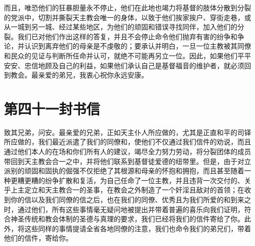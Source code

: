 而且，唯恐他们的狂暴胆量永不停止，他们在此地也竭力将基督的肢体分散到分裂的党派中，切割并撕裂天主教会唯一的身体，以致于他们挨家挨户、穿街走巷，或从一城到另一城、经过某些地区，为他们的顽固和错误寻找同伴，加入他们的分裂。我们已对他们作出这样的答复，并且不会停止命令他们抛弃有害的纷争和争论，并认识到离弃他们的母亲是不虔敬的；要承认并明白，一旦一位主教被其同僚和民众的见证与判断所任命并认可，就绝不可能再另立一位。因此，如果他们平平安安、忠信地顾及自己的利益，如果他们承认自己是基督福音的维护者，就必须回到教会。最亲爱的弟兄，我衷心祝你永远安康。\par



\section{第四十一封书信}

\par

\par

致其兄弟，问安。最亲爱的兄弟，正如天主仆人所应做的，尤其是正直和平的司铎所应做的，我们最近派遣了我们的同僚和，使他们不仅通过我们信件的劝说，而且通过他们本人的在场和你们所有人的建议，竭尽全力努力劳动，将分裂团体的成员带回到天主教会合一之中，并将他们联系到基督徒爱德的纽带里。但是，由于对立派别的顽固和固执的倔强不仅拒绝了其根源和母亲的怀抱和拥抱，而且甚至随着一种更糟更糟的纷争扩散和复活，为自己任命了一位主教，并且违背一次交付的、关乎上主定立和天主教合一的圣事，在教会之外制造了一个奸淫且敌对的首领；在收到你的信以及我们同僚的信之后，也在我们的同僚、优秀且为我们所爱的和到来之时，通过他们，所有这些事情毫无疑问地被提出并带着普遍的喜乐向我们证明，符合神圣传统和教会体制的圣德与真理的要求，我们已经将我们的信件寄给了你。此外，将这些同样的事情提请全省各地同僚的注意，我们也命令我们的弟兄们，带着他们的信件，寄给你。\par

